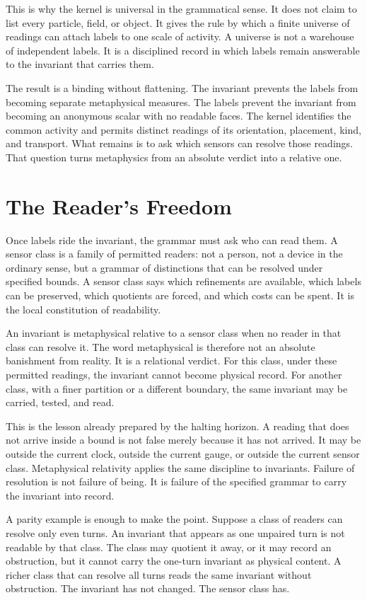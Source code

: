 This is why the kernel is universal in the grammatical sense. It does not
claim to list every particle, field, or object. It gives the rule by which a
finite universe of readings can attach labels to one scale of activity. A
universe is not a warehouse of independent labels. It is a disciplined
record in which labels remain answerable to the invariant that carries
them.

The result is a binding without flattening. The invariant prevents the
labels from becoming separate metaphysical measures. The labels prevent the
invariant from becoming an anonymous scalar with no readable faces. The
kernel identifies the common activity and permits distinct readings of its
orientation, placement, kind, and transport. What remains is to ask which
sensors can resolve those readings. That question turns metaphysics from an
absolute verdict into a relative one.

\section{The Reader's Freedom}

Once labels ride the invariant, the grammar must ask who can read them. A
sensor class is a family of permitted readers: not a person, not a device in
the ordinary sense, but a grammar of distinctions that can be resolved under
specified bounds. A sensor class says which refinements are available, which
labels can be preserved, which quotients are forced, and which costs can be
spent. It is the local constitution of readability.

An invariant is metaphysical relative to a sensor class when no reader in
that class can resolve it. The word metaphysical is therefore not an
absolute banishment from reality. It is a relational verdict. For this
class, under these permitted readings, the invariant cannot become physical
record. For another class, with a finer partition or a different boundary,
the same invariant may be carried, tested, and read.

This is the lesson already prepared by the halting horizon. A reading that
does not arrive inside a bound is not false merely because it has not
arrived. It may be outside the current clock, outside the current gauge, or
outside the current sensor class. Metaphysical relativity applies the same
discipline to invariants. Failure of resolution is not failure of being. It
is failure of the specified grammar to carry the invariant into record.

A parity example is enough to make the point. Suppose a class of readers can
resolve only even turns. An invariant that appears as one unpaired turn is
not readable by that class. The class may quotient it away, or it may record
an obstruction, but it cannot carry the one-turn invariant as physical
content. A richer class that can resolve all turns reads the same invariant
without obstruction. The invariant has not changed. The sensor class has.

